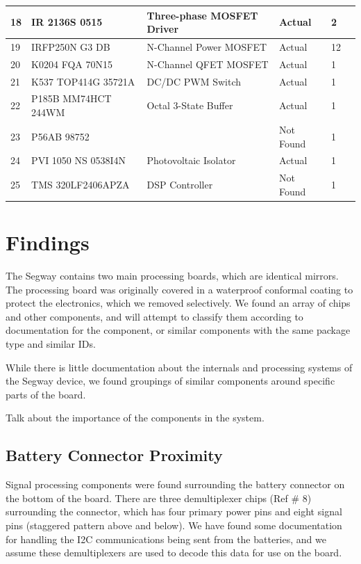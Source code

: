 \documentclass[]{formalLabReport}
\begin{document}
\begin{table}
\begin{tabular}{|l|l|l|l|l|l|}
    18    & IR 2136S 0515       & Three-phase MOSFET Driver  & Actual        & 2        \\ \hline
    19    & IRFP250N G3 DB      & N-Channel Power MOSFET     & Actual        & 12       \\ \hline
    20    & K0204 FQA 70N15     & N-Channel QFET MOSFET      & Actual        & 1        \\ \hline
    21    & K537 TOP414G 35721A & DC/DC PWM Switch           & Actual        & 1        \\ \hline
    22    & P185B MM74HCT 244WM & Octal 3-State Buffer       & Actual        & 1        \\ \hline
    23    & P56AB 98752         &                            & Not Found     & 1        \\ \hline
    24    & PVI 1050 NS 0538I4N & Photovoltaic Isolator      & Actual        & 1        \\ \hline
    25    & TMS 320LF2406APZA   & DSP Controller             & Not Found     & 1        \\ \hline
    \end{tabular}
\end{table}

\section{Findings}
The Segway contains two main processing boards, which are identical mirrors. The processing board was
originally covered in a waterproof conformal coating to protect the electronics, which we removed selectively.
We found an array of chips and other components, and will attempt to classify them according to 
documentation for the component, or similar components with the same package type and similar IDs. 

While there is little documentation about the internals and processing systems of the Segway device, we found
groupings of similar components around specific parts of the board.

Talk about the importance of the components in the system.

\subsection{Battery Connector Proximity}
Signal processing components were found surrounding the battery connector on the bottom of the board.
There are three demultiplexer chips (Ref \# 8) surrounding the connector, which has four primary power pins
and eight signal pins (staggered pattern above and below). We have found some documentation for handling the
I2C communications being sent from the batteries, and we assume these demultiplexers are used to decode this
data for use on the board.
\end{document}
